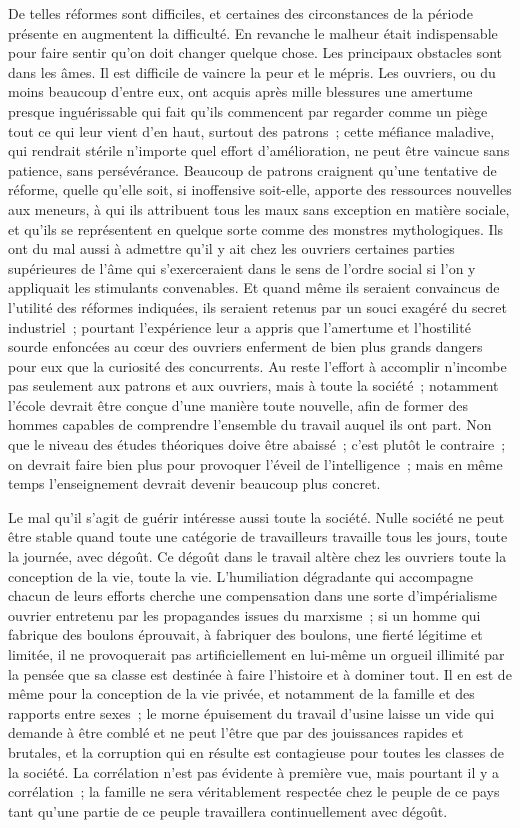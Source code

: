 \documentclass[french,twoside]{book} %
\begin{document}
De telles réformes sont difficiles, et certaines des circonstances de la période présente en augmentent la difficulté. En revanche le malheur était indispensable pour faire sentir qu'on doit changer quelque chose. Les principaux obstacles sont dans les âmes. Il est difficile de vaincre la peur et le mépris. Les ouvriers, ou du moins beaucoup d'entre eux, ont acquis après mille blessures une amertume presque inguérissable qui fait qu'ils commencent par regarder comme un piège tout ce qui leur vient d'en haut, surtout des patrons ; cette méfiance maladive, qui rendrait stérile n'importe quel effort d'amélioration, ne peut être vaincue sans patience, sans persévérance. Beaucoup de patrons craignent qu'une tentative de réforme, quelle qu'elle soit, si inoffensive soit-elle, apporte des ressources nouvelles aux meneurs, à qui ils attribuent tous les maux sans exception en matière sociale, et qu'ils se représentent en quelque sorte comme des monstres mythologiques. Ils ont du mal aussi à admettre qu'il y ait chez les ouvriers certaines parties supérieures de l'âme qui s'exerceraient dans le sens de l'ordre social si l'on y appliquait les stimulants convenables. Et quand même ils seraient convaincus de l'utilité des réformes indiquées, ils seraient retenus par un souci exagéré du secret industriel ; pourtant l'expérience leur a appris que l'amertume et l'hostilité sourde enfoncées au cœur des ouvriers enferment de bien plus grands dangers pour eux que la curiosité des concurrents. Au reste l'effort à accomplir n'incombe pas seulement aux patrons et aux ouvriers, mais à toute la société ; notamment l'école devrait être conçue d'une manière toute nouvelle, afin de former des hommes capables de comprendre l'ensemble du travail auquel ils ont part. Non que le niveau des études théoriques doive être abaissé ; c'est plutôt le contraire ; on devrait faire bien plus pour provoquer l'éveil de l'intelligence ; mais en même temps l'enseignement devrait devenir beaucoup plus concret.\par
Le mal qu'il s'agit de guérir intéresse aussi toute la société. Nulle société ne peut être stable quand toute une catégorie de travailleurs travaille tous les jours, toute la journée, avec dégoût. Ce dégoût dans le travail altère chez les ouvriers toute la conception de la vie, toute la vie. L'humiliation dégradante qui accompagne chacun de leurs efforts cherche une compensation dans une sorte d'impérialisme ouvrier entretenu par les propagandes issues du marxisme ; si un homme qui fabrique des boulons éprouvait, à fabriquer des boulons, une fierté légitime et limitée, il ne provoquerait pas artificiellement en lui-même un orgueil illimité par la pensée que sa classe est destinée à faire l'histoire et à dominer tout. Il en est de même pour la conception de la vie privée, et notamment de la famille et des rapports entre sexes ; le morne épuisement du travail d'usine laisse un vide qui demande à être comblé et ne peut l'être que par des jouissances rapides et brutales, et la corruption qui en résulte est contagieuse pour toutes les classes de la société. La corrélation n'est pas évidente à première vue, mais pourtant il y a corrélation ; la famille ne sera véritablement respectée chez le peuple de ce pays tant qu'une partie de ce peuple travaillera continuellement avec dégoût.\par
\end{document}

